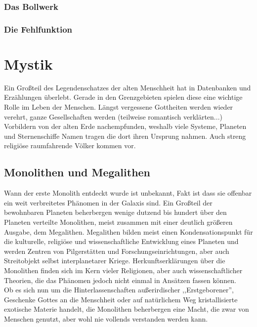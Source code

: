 \documentclass[10pt,a4paper]{report}
\begin{document}
\subsection*{Das Bollwerk}
\subsection*{Die Fehlfunktion}

\chapter{Mystik}
Ein Großteil des Legendenschatzes der alten Menschheit hat in Datenbanken und Erzählungen überlebt. Gerade in den Grenzgebieten spielen diese eine wichtige Rolle im Leben der Menschen. Längst vergessene Gottheiten werden wieder verehrt, ganze Gesellschaften werden (teilweise romantisch verklärten...) Vorbildern von der alten Erde nachempfunden, weshalb viele Systeme, Planeten und Sternenschiffe Namen tragen die dort ihren Ursprung nahmen. Auch streng religiöse raumfahrende Völker kommen vor.

\section{Monolithen und Megalithen}
Wann der erste Monolith entdeckt wurde ist unbekannt, Fakt ist dass sie offenbar ein weit verbreitetes Phänomen in der Galaxis sind. Ein Großteil der bewohnbaren Planeten beherbergen wenige dutzend bis hundert über den Planeten verteilte Monolithen, meist zusammen mit einer deutlich größeren Ausgabe, dem Megalithen. Megalithen bilden meist einen Kondensationspunkt für die kulturelle, religiöse und wissenschaftliche Entwicklung eines Planeten und werden Zentren von Pilgerstätten und Forschungseinrichtungen, aber auch Streitobjekt selbst interplanetarer Kriege. Herkunftserklärungen über die Monolithen finden sich im Kern vieler Religionen, aber auch wissenschaftlicher Theorien, die das Phänomen jedoch nicht einmal in Ansätzen fassen können.\\
Ob es sich nun um die Hinterlassenschaften außerirdischer ,,Erstgeborener'', Geschenke Gottes an die Menschheit oder auf natürlichem Weg  kristallisierte exotische Materie handelt, die Monolithen beherbergen eine Macht, die zwar von Menschen genutzt, aber wohl nie vollends verstanden werden kann.\\

\newpage
\end{document}
